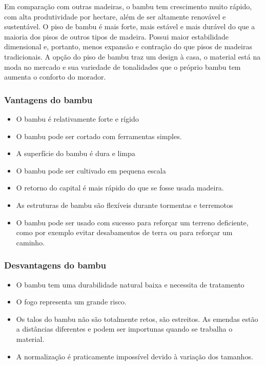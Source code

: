 	Em comparação com outras madeiras, o bambu tem crescimento muito rápido, com alta produtividade por hectare, além de ser altamente renovável e sustentável. O piso de bambu é mais forte, mais estável e mais durável do que a maioria dos pisos de outros tipos de madeira. Possui maior estabilidade dimensional e, portanto, menos expansão e contração do que pisos de madeiras tradicionais. A opção do piso de bambu traz um design à casa, o material está na moda no mercado e sua variedade de tonalidades que o próprio bambu tem aumenta o conforto do morador.


\subsubsection*{\textbf{Vantagens do bambu}}

	\begin{itemize}

		\item O bambu é relativamente forte e rígido

		\item O bambu pode ser cortado com ferramentas simples.

		\item A superfície do bambu é dura e limpa

		\item O bambu pode ser cultivado em pequena escala

		\item O retorno do capital é mais rápido do que se fosse usada madeira.

		\item As estruturas de bambu são flexíveis durante tormentas e terremotos

		\item O bambu pode ser usado com sucesso para reforçar um terreno deficiente, como por exemplo evitar desabamentos de terra ou para reforçar um caminho.
	\end{itemize}

\subsubsection*{\textbf{Desvantagens do bambu}}

	\begin{itemize}

		\item O bambu tem uma durabilidade natural baixa e necessita de tratamento

		\item O fogo representa um grande risco.

		\item Os talos do bambu não são totalmente retos, são estreitos. As emendas estão a distâncias diferentes e podem ser importunas quando se trabalha o material.

		\item A normalização é praticamente impossível devido à variação dos tamanhos.
	\end{itemize}

